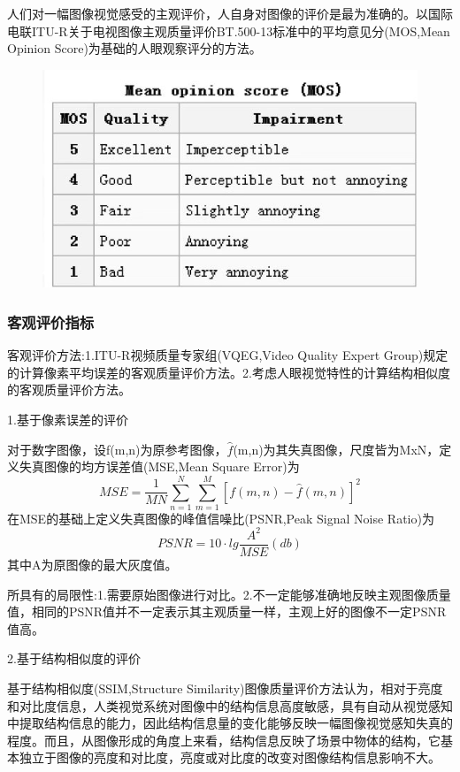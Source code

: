 \documentclass[11pt]{article}
\begin{document}
人们对一幅图像视觉感受的主观评价，人自身对图像的评价是最为准确的。以国际电联ITU-R关于电视图像主观质量评价BT.500-13标准中的平均意见分(MOS,Mean Opinion Score)为基础的人眼观察评分的方法。

\begin{figure}[h]
	\centering
	\includegraphics[scale = 0.5]{MOS}
\end{figure}

\subsubsection{客观评价指标}

客观评价方法:1.ITU-R视频质量专家组(VQEG,Video Quality Expert Group)规定的计算像素平均误差的客观质量评价方法。2.考虑人眼视觉特性的计算结构相似度的客观质量评价方法。

1.基于像素误差的评价

对于数字图像，设f(m,n)为原参考图像，$\hat{f}$(m,n)为其失真图像，尺度皆为MxN，定义失真图像的均方误差值(MSE,Mean Square Error)为
$$MSE = \frac{1}{MN}\sum_{n=1}^{N}\sum_{m=1}^{M}[f(m,n)-\hat{f}(m,n)]^2$$
在MSE的基础上定义失真图像的峰值信噪比(PSNR,Peak Signal Noise Ratio)为
$$PSNR = 10\cdot lg \frac{A^2}{MSE}(db)$$
其中A为原图像的最大灰度值。

所具有的局限性:1.需要原始图像进行对比。2.不一定能够准确地反映主观图像质量值，相同的PSNR值并不一定表示其主观质量一样，主观上好的图像不一定PSNR值高。

2.基于结构相似度的评价

基于结构相似度(SSIM,Structure Similarity)图像质量评价方法认为，相对于亮度和对比度信息，人类视觉系统对图像中的结构信息高度敏感，具有自动从视觉感知中提取结构信息的能力，因此结构信息量的变化能够反映一幅图像视觉感知失真的程度。而且，从图像形成的角度上来看，结构信息反映了场景中物体的结构，它基本独立于图像的亮度和对比度，亮度或对比度的改变对图像结构信息影响不大。
\end{document}

